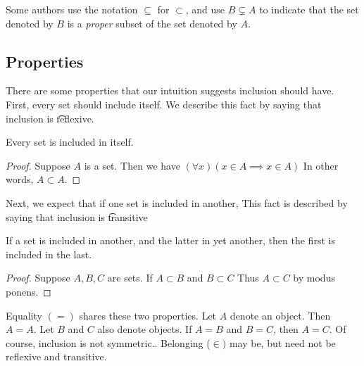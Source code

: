 Some authors use the notation $\subseteq$ for $\subset$, and use $B \subsetneq A$ to indicate that the set denoted by $B$ is a \textit{proper} subset of the set denoted by $A$.

\subsection*{Properties}


There are some properties that our intuition suggests inclusion should have.
First, every set should include itself.
We describe this fact by saying that inclusion is \t{reflexive}.
\begin{proposition}[Reflexive]
Every set is included in itself.\end{proposition}
\begin{proof}Suppose $A$ is a set.
Then we have $(\forall x)(x \in A \implies x \in A)$
In other words, $A \subset A$.\end{proof}
%  


Next, we expect that if one set is included in another,
This fact is described by saying that inclusion is \t{transitive}
\begin{proposition}[Transitive]
If a set is included in another, and the latter in yet another, then the first is included in the last.\end{proposition}
\begin{proof}Suppose $A, B, C$ are sets.
If $A \subset B$ and $B \subset C$
Thus $A \subset C$ by modus ponens.\end{proof}
%  



Equality $(=)$ shares these two properties.
Let $A$ denote an object.
Then $A = A$.
Let $B$ and $C$ also denote objects.
If $A = B$ and $B = C$, then $A = C$.
Of course, inclusion is not symmetric..
Belonging ($\in)$ may be, but need not be reflexive and transitive.

